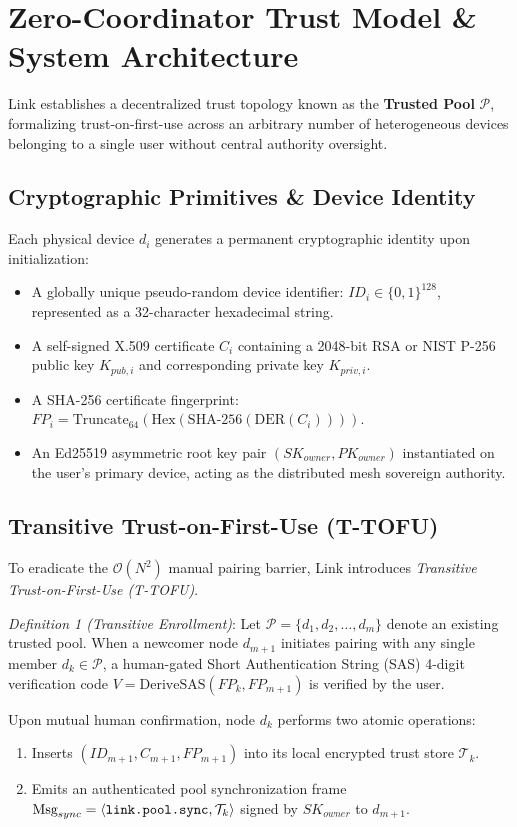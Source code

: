 \documentclass[conference]{IEEEtran}
\begin{document}
\section{Zero-Coordinator Trust Model \& System Architecture}
\label{sec:trust}

Link establishes a decentralized trust topology known as the \textbf{Trusted Pool} $\mathcal{P}$, formalizing trust-on-first-use across an arbitrary number of heterogeneous devices belonging to a single user without central authority oversight.

\subsection{Cryptographic Primitives \& Device Identity}
Each physical device $d_i$ generates a permanent cryptographic identity upon initialization:
\begin{itemize}
    \item A globally unique pseudo-random device identifier: $ID_i \in \{0,1\}^{128}$, represented as a 32-character hexadecimal string.
    \item A self-signed X.509 certificate $C_i$ containing a 2048-bit RSA or NIST P-256 public key $K_{pub,i}$ and corresponding private key $K_{priv,i}$.
    \item A SHA-256 certificate fingerprint: $FP_i = \text{Truncate}_{64}(\text{Hex}(\text{SHA-256}(\text{DER}(C_i))))$.
    \item An Ed25519 asymmetric root key pair $(SK_{owner}, PK_{owner})$ instantiated on the user's primary device, acting as the distributed mesh sovereign authority.
\end{itemize}

\subsection{Transitive Trust-on-First-Use (T-TOFU)}
To eradicate the $\mathcal{O}(N^2)$ manual pairing barrier, Link introduces \textit{Transitive Trust-on-First-Use (T-TOFU)}. 

\textit{Definition 1 (Transitive Enrollment)}: Let $\mathcal{P} = \{d_1, d_2, \dots, d_m\}$ denote an existing trusted pool. When a newcomer node $d_{m+1}$ initiates pairing with any single member $d_k \in \mathcal{P}$, a human-gated Short Authentication String (SAS) 4-digit verification code $V = \text{DeriveSAS}(FP_k, FP_{m+1})$ is verified by the user. 

Upon mutual human confirmation, node $d_k$ performs two atomic operations:
\begin{enumerate}
    \item Inserts $(ID_{m+1}, C_{m+1}, FP_{m+1})$ into its local encrypted trust store $\mathcal{T}_k$.
    \item Emits an authenticated pool synchronization frame $\text{Msg}_{sync} = \langle \text{\texttt{link.pool.sync}}, \mathcal{T}_k \rangle$ signed by $SK_{owner}$ to $d_{m+1}$.
\end{enumerate}
\end{document}
